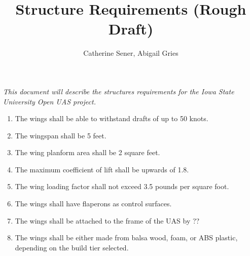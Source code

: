 \documentclass{article}
\begin{document}
	\title{Structure Requirements (Rough Draft)}
	
	\author{Catherine Sener, Abigail Gries}
	\maketitle
	
	\textit{This document will describe the structures requirements for the Iowa State University Open UAS project.}
	\begin{enumerate}
		
		\section{Wings}
		
		\item The wings shall be able to withstand drafts of up to 50 knots.\\
		\item The wingspan shall be 5 feet.\\
		\item The wing planform area shall be 2 square feet.\\
		\item The maximum coefficient of lift shall be upwards of 1.8.\\
		\item The wing loading factor shall not exceed 3.5 pounds per square foot.\\
		\item The wings shall have flaperons as control surfaces.\\
		\item The wings shall be attached to the frame of the UAS by ??\\
		\item The wings shall be either made from balsa wood, foam, or ABS plastic, depending on the build tier selected. \\
		
	\end{enumerate}
		
\end{document}
